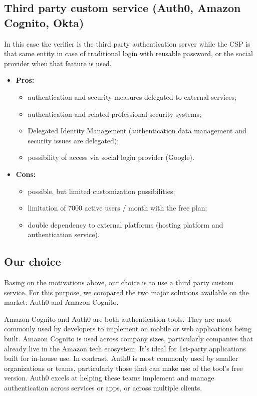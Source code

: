 \subsection{Third party custom service (Auth0, Amazon Cognito, Okta)}
In this case the verifier is the third party authentication server while the CSP is that same entity in case of traditional login with reusable password, or the social provider when that feature is used.
\begin{itemize}
	\item \textbf{Pros:}
	\begin{itemize}
		\item authentication and security measures delegated to external services;
		\item authentication and related professional security systems;
		\item Delegated Identity Management (authentication data management and security issues are delegated);
		\item possibility of access via social login provider (Google).
	\end{itemize}
	\item \textbf{Cons:}
	\begin{itemize}
		\item possible, but limited customization possibilities;
		\item limitation of 7000 active users / month with the free plan;
		\item double dependency to external platforms (hosting platform and authentication service).
	\end{itemize}
\end{itemize}

\subsection{Our choice}
Basing on the motivations above, our choice is to use a third party custom service. For this purpose, we compared the two major solutions available on the market: Auth0 and Amazon Cognito.

Amazon Cognito and Auth0 are both authentication tools. They are most commonly used by developers to implement on mobile or web applications being built. 
Amazon Cognito is used across company sizes, particularly companies that already live in the Amazon tech ecosystem. It’s ideal for 1st-party applications built for in-house use. In contrast, Auth0 is most commonly used by smaller organizations or teams, particularly those that can make use of the tool’s free version. Auth0 excels at helping these teams implement and manage authentication across services or apps, or across multiple clients. 
